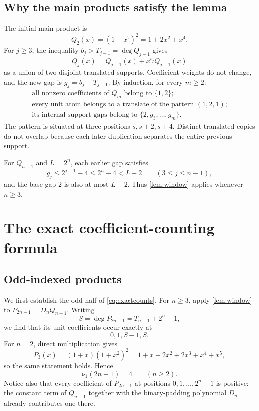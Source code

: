 \documentclass[11pt]{article}
\theoremstyle{definition}\newtheorem{definition}[theorem]{Definition}
\theoremstyle{remark}\newtheorem{remark}[theorem]{Remark}
\newcommand{\nuone}{\nu_1}
\begin{document}
\subsection{Why the main products satisfy the lemma}

The initial main product is
\begin{equation}\label{eq:Q2}
 Q_2(x)=(1+x^2)^2=1+2x^2+x^4.
\end{equation}
For $j\geq3$, the inequality $b_j>T_{j-1}=\deg Q_{j-1}$ gives
\[
 Q_j(x)=Q_{j-1}(x)+x^{b_j}Q_{j-1}(x)
\]
as a union of two disjoint translated supports. Coefficient weights do not change, and the new gap is $g_j=b_j-T_{j-1}$. By induction, for every $m\geq2$:
\begin{equation}\label{eq:Qstructure}
 \begin{gathered}
 \text{all nonzero coefficients of $Q_m$ belong to $\{1,2\}$;}\\
 \text{every unit atom belongs to a translate of the pattern $(1,2,1)$;}\\
 \text{its internal support gaps belong to $\{2,g_3,\ldots,g_m\}$.}
 \end{gathered}
\end{equation}
The pattern is situated at three positions $s,s+2,s+4$. Distinct translated copies do not overlap because each later duplication separates the entire previous support.

For $Q_{n-1}$ and $L=2^n$, each earlier gap satisfies
\[
 g_j\leq2^{j+1}-4\leq2^n-4<L-2\qquad(3\leq j\leq n-1),
\]
and the base gap $2$ is also at most $L-2$. Thus \cref{lem:window} applies whenever $n\geq3$.

\section{The exact coefficient-counting formula}

\subsection{Odd-indexed products}

We first establish the odd half of \eqref{eq:exactcounts}. For $n\geq3$, apply \cref{lem:window} to $P_{2n-1}=D_nQ_{n-1}$. Writing
\begin{equation}\label{eq:Sodd}
 S=\deg P_{2n-1}=T_{n-1}+2^n-1,
\end{equation}
we find that its unit coefficients occur exactly at
\begin{equation}\label{eq:oddpositions}
 0,1,S-1,S.
\end{equation}
For $n=2$, direct multiplication gives
\[
 P_3(x)=(1+x)(1+x^2)^2
       =1+x+2x^2+2x^3+x^4+x^5,
\]
so the same statement holds. Hence
\begin{equation}\label{eq:oddcount}
 \nuone(2n-1)=4\qquad(n\geq2).
\end{equation}
Notice also that every coefficient of $P_{2n-1}$ at positions $0,1,\ldots,2^n-1$ is positive: the constant term of $Q_{n-1}$ together with the binary-padding polynomial $D_n$ already contributes one there.
\end{document}
